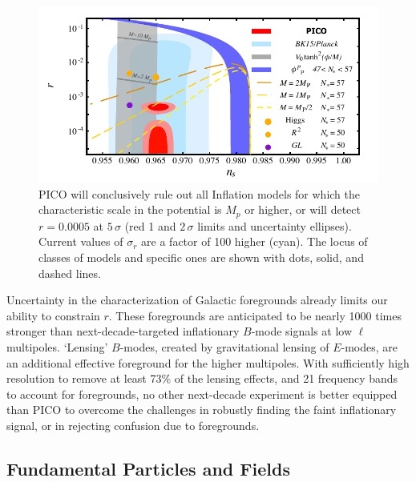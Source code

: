 \documentclass[PICOAPC.tex]{subfiles}
\begin{document}
\begin{figure}[!thb]
\hspace{-0.13in}
\parbox{4.4in}{\centerline{
\includegraphics[width=4.5in]{figures/nsrlabeledrp0005_PICOv6.pdf} } }
\parbox{2.1in}{
\caption{\captiontext  PICO will conclusively rule out all Inflation models for which the characteristic scale in the potential is $M_{p}$ or higher, or will detect $r=0.0005$ at $5\, \sigma$ (red 1 and $2\,\sigma$ limits and uncertainty ellipses). Current values of $\sigma_{r}$ are a factor of 100 higher (cyan). 
The locus of classes of models and specific ones are shown with dots, solid, and dashed lines. }
\label{fig:nsr}}
\vspace{-0.16in}
\end{figure}

Uncertainty in the characterization of Galactic foregrounds already limits our ability to constrain $r$. These foregrounds 
are anticipated to be nearly 1000 times stronger than next-decade-targeted inflationary $B$-mode signals at low $\ell$ multipoles. %
`Lensing' $B$-modes, created by gravitational lensing of $E$-modes, are an additional effective foreground for the higher multipoles. With sufficiently high resolution to remove at least 73\% of the lensing effects, and 21 frequency bands to account for foregrounds, no other next-decade experiment is better equipped than PICO to overcome the challenges in robustly finding the faint inflationary signal, or in rejecting confusion due to foregrounds. 

\vspace{-0.06in}

\subsection{Fundamental Particles and Fields} %
\label{sec:relics_neutrinos}

\end{document}
